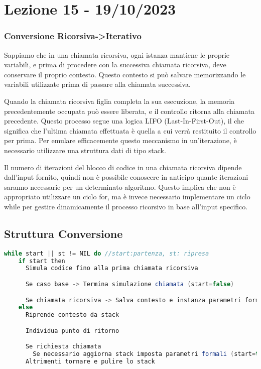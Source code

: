 \section{Lezione 15 - 19/10/2023}
\subsubsection{Conversione Ricorsiva->Iterativo}
Sappiamo che in una chiamata ricorsiva, ogni istanza mantiene le proprie variabili, e prima di procedere con la successiva chiamata ricorsiva, deve conservare il proprio contesto. Questo contesto si può salvare memorizzando le variabili utilizzate prima di passare alla chiamata successiva. 
\smallskip

Quando la chiamata ricorsiva figlia completa la sua esecuzione, la memoria precedentemente occupata può essere liberata, e il controllo ritorna alla chiamata precedente. Questo processo segue una logica LIFO (Last-In-First-Out), il che significa che l'ultima chiamata effettuata è quella a cui verrà restituito il controllo per prima. Per emulare efficacemente questo meccanismo in un'iterazione, è necessario utilizzare una struttura dati di tipo stack.
\smallskip

Il numero di iterazioni del blocco di codice in una chiamata ricorsiva dipende dall'input fornito, quindi non è possibile conoscere in anticipo quante iterazioni saranno necessarie per un determinato algoritmo. Questo implica che non è appropriato utilizzare un ciclo for, ma è invece necessario implementare un ciclo while per gestire dinamicamente il processo ricorsivo in base all'input specifico.
\subsection{Struttura Conversione}

\begin{lstlisting}[language=Java]
	while start || st != NIL do //start:partenza, st: ripresa
    if start then
      Simula codice fino alla prima chiamata ricorsiva

      Se caso base -> Termina simulazione chiamata (start=false)

      Se chiamata ricorsiva -> Salva contesto e instanza parametri formali
    else 
      Riprende contesto da stack

      Individua punto di ritorno

      Se richiesta chiamata
        Se necessario aggiorna stack imposta parametri formali (start=true)
      Altrimenti tornare e pulire lo stack
\end{lstlisting}

